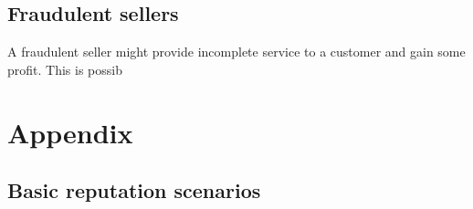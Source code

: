 \documentclass[11pt]{article}
\begin{document}
\subsection{Fraudulent sellers}

A fraudulent seller might provide incomplete service to a customer and gain some profit. This is possib

\newpage

\section{Appendix} \label{appendix}

\subsection{Basic reputation scenarios} \label{appendix:basicReputation}
\end{document}
